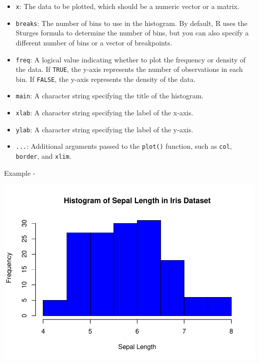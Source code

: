 \documentclass[
]{book}
\newenvironment{Shaded}{\begin{snugshade}}{\end{snugshade}}
\newcommand{\AttributeTok}[1]{\textcolor[rgb]{0.13,0.29,0.53}{#1}}
\newcommand{\DecValTok}[1]{\textcolor[rgb]{0.00,0.00,0.81}{#1}}
\newcommand{\FunctionTok}[1]{\textcolor[rgb]{0.13,0.29,0.53}{\textbf{#1}}}
\newcommand{\NormalTok}[1]{#1}
\newcommand{\SpecialCharTok}[1]{\textcolor[rgb]{0.81,0.36,0.00}{\textbf{#1}}}
\newcommand{\StringTok}[1]{\textcolor[rgb]{0.31,0.60,0.02}{#1}}
\providecommand{\tightlist}{%
  \setlength{\itemsep}{0pt}\setlength{\parskip}{0pt}}
\begin{document}
\begin{itemize}
\tightlist
\item
  \texttt{x}: The data to be plotted, which should be a numeric vector or a matrix.
\item
  \texttt{breaks}: The number of bins to use in the histogram. By default, R uses the Sturges formula to determine the number of bins, but you can also specify a different number of bins or a vector of breakpoints.
\item
  \texttt{freq}: A logical value indicating whether to plot the frequency or density of the data. If \texttt{TRUE}, the y-axis represents the number of observations in each bin. If \texttt{FALSE}, the y-axis represents the density of the data.
\item
  \texttt{main}: A character string specifying the title of the histogram.
\item
  \texttt{xlab}: A character string specifying the label of the x-axis.
\item
  \texttt{ylab}: A character string specifying the label of the y-axis.
\item
  \texttt{...}: Additional arguments passed to the \texttt{plot()} function, such as \texttt{col}, \texttt{border}, and \texttt{xlim}.
\end{itemize}

Example -

\begin{Shaded}
\end{Shaded}

\begin{center}\includegraphics[height=0.55\textheight]{DauR_files/figure-latex/p11-1} \end{center}
\end{document}
